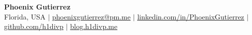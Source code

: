 \begin{center}
    \textbf{\Huge Phoenix Gutierrez} \\ \vspace{1pt}
    \small Florida, USA $|$
    \href{mailto:phoenixgutierrez@pm.me}{\underline{phoenixgutierrez@pm.me}} $|$
    \href{https://linkedin.com/in/PhoenixGutierrez}{\underline{linkedin.com/in/PhoenixGutierrez}} $|$
    \href{https://github.com/h1divp}{\underline{github.com/h1divp}} $|$
    \href{https://blog.h1divp.me}{\underline{blog.h1divp.me}}
\end{center}
